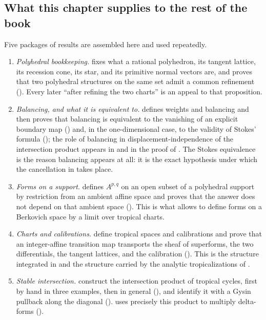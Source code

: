 \subsection*{What this chapter supplies to the rest of the book}

Five packages of results are assembled here and used repeatedly.

\begin{enumerate}
\item \emph{Polyhedral bookkeeping.}
 fixes what a rational polyhedron, its tangent
lattice, its recession cone, its star, and its primitive normal vectors are,
and proves that two polyhedral structures on the same set admit a common
refinement ().  Every later
``after refining the two charts'' is an appeal to that proposition.

\item \emph{Balancing, and what it is equivalent to.}
 defines weights and balancing and then proves that
balancing is equivalent to the vanishing of an explicit boundary map
() and, in the one-dimensional
case, to the validity of Stokes' formula
(); the role of balancing in
displacement-independence of the intersection product appears in
 and in the proof of
.  The Stokes equivalence is the
reason balancing appears at all: it is the exact hypothesis under which the
cancellation in  takes place.

\item \emph{Forms on a support.}
 defines $A^{p,q}$ on an open subset of a polyhedral
support by restriction from an ambient affine space and proves that the
answer does not depend on that ambient space
().  This is what allows
 to define forms on a Berkovich space by
a limit over tropical charts.

\item \emph{Charts and calibrations.}
 define tropical spaces
and calibrations and prove that an integer-affine transition map transports
the sheaf of superforms, the two differentials, the tangent lattices, and the
calibration ().  This is the structure
integrated in  and the structure carried by
the analytic tropicalizations of .

\item \emph{Stable intersection.}
 construct the intersection
product of tropical cycles, first by hand in three examples, then in general
(), and identify it with a Gysin
pullback along the diagonal
().   uses precisely
this product to multiply delta-forms
().
\end{enumerate}

